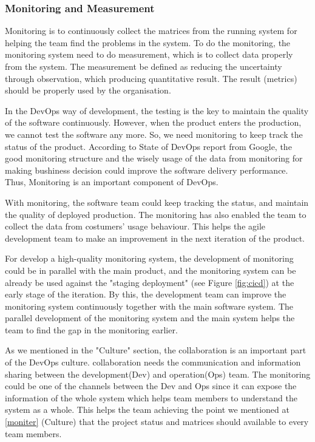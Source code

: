 \subsubsection[]{Monitoring and Measurement}
Monitoring is to continuously collect the matrices from the running system for helping the team find the problems in the system. To do the monitoring, the monitoring system need to do measurement, which is to collect data properly from the system. The measurement be defined as reducing the uncertainty through observation, which producing quantitative result. \cite{hering2015measure} The result (metrics) should be properly used by the organisation.
\par
In the DevOps way of development, the testing is the key to maintain the quality of the software continuously. However, when the product enters the production, we cannot test the software any more. So, we need monitoring to keep track the status of the product.\cite{huttermann2012devops} According to State of DevOps report from Google, the good monitoring structure and the wisely usage of the data from monitoring for making bushiness decision could improve the software delivery performance. \cite{forsgrenaccelerate} Thus, Monitoring is an important component of DevOps.
\par
With monitoring, the software team could keep tracking the status, and maintain the quality of deployed production. The monitoring has also enabled the team to collect the data from costumers' usage behaviour. This helps the agile development team to make an improvement in the next iteration of the product. \cite{lwakatare2015dimensions}
\par
For develop a high-quality monitoring system, the development of monitoring could be in parallel with the main product, and the monitoring system can be already be used against the "staging deployment" (see Figure \ref{fig:cicd}) at the early stage of the iteration. By this, the development team can improve the monitoring system continuously together with the main software system. The parallel development of the monitoring system and the main system helps the team to find the gap in the monitoring earlier.\cite{huttermann2012devops}
\par
As we mentioned in the "Culture" section, the collaboration is an important part of the DevOps culture. collaboration needs the communication and information sharing between the development(Dev) and operation(Ops) team. The monitoring could be one of the channels between the Dev and Ops since it can expose the information of the whole system which helps team members to understand the system as a whole. This helps the team achieving the point we mentioned at \ref{moniter} (Culture) that the project status and matrices should available to every team members.
